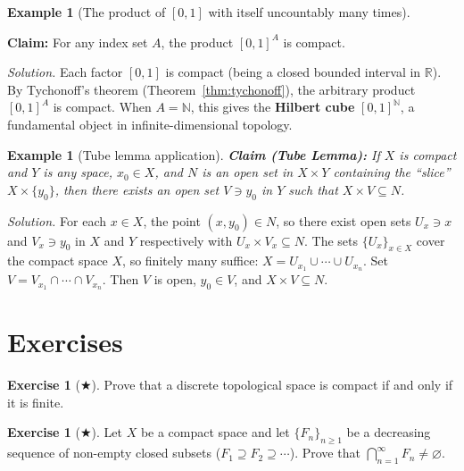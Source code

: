\documentclass[11pt,a4paper,twoside]{book}
\theoremstyle{remark}
\theoremstyle{definition}
\newtheorem{exampleplain}[theorem]{Example}
\newtheorem{exerciseplain}[theorem]{Exercise}
\theoremstyle{definition}
\newenvironment{example}[1][]{%
  \begin{exampleplain}[#1]\itshape
}{%
  \end{exampleplain}
}
\newenvironment{exercise}[1][]{%
  \begin{exerciseplain}[#1]
}{%
  \end{exerciseplain}
}
\begin{document}
\begin{example}[{The product of ${[0,1]}$ with itself uncountably many times}]
\label{ex:hilbert-cube-general}
\textbf{Claim:} For any index set $A$, the product $[0,1]^A$ is compact.

\textit{Solution.}  Each factor $[0,1]$ is compact (being a closed bounded
interval in $\mathbb{R}$).  By Tychonoff's theorem
(Theorem~\ref{thm:tychonoff}), the arbitrary product $[0,1]^A$ is compact.
When $A = \mathbb{N}$, this gives the \textbf{Hilbert cube}
$[0,1]^{\mathbb{N}}$, a fundamental object in infinite-dimensional topology.
\end{example}

\begin{example}[Tube lemma application]\label{ex:tube-lemma}
\textbf{Claim (Tube Lemma):} If $X$ is compact and $Y$ is any space, $x_0 \in X$,
and $N$ is an open set in $X \times Y$ containing the ``slice''
$X \times \{y_0\}$, then there exists an open set $V \ni y_0$ in $Y$ such that
$X \times V \subseteq N$.

\textit{Solution.}  For each $x \in X$, the point $(x, y_0) \in N$, so there
exist open sets $U_x \ni x$ and $V_x \ni y_0$ in $X$ and $Y$ respectively with
$U_x \times V_x \subseteq N$.  The sets $\{U_x\}_{x \in X}$ cover the compact
space $X$, so finitely many suffice: $X = U_{x_1} \cup \cdots \cup U_{x_n}$.
Set $V = V_{x_1} \cap \cdots \cap V_{x_n}$.  Then $V$ is open, $y_0 \in V$,
and $X \times V \subseteq N$.
\end{example}

\section{Exercises}
\label{sec:compactness-exercises}

\begin{exercise}[$\bigstar$]\label{exo:compact-discrete}
Prove that a discrete topological space is compact if and only if it is finite.
\end{exercise}

\begin{exercise}[$\bigstar$]\label{exo:compact-intersection}
Let $X$ be a compact space and let $\{F_n\}_{n \ge 1}$ be a decreasing
sequence of non-empty closed subsets ($F_1 \supseteq F_2 \supseteq \cdots$).
Prove that $\bigcap_{n=1}^\infty F_n \neq \varnothing$.
\end{exercise}
\end{document}
